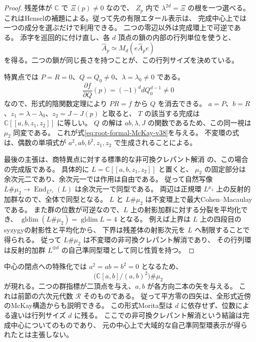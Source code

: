 \begin{proof}
残差体が $\mathbb C$ で $\Xi(p)\ne0$ なので、
$\widehat Z_p$ 内で $\lambda^{2d}=\Xi$ の根を一つ選べる。
これはHenselの補題による。従って先の有限エタール表示は、
完成中心上では一つの成分を選ぶだけで利用できる。
二つの零辺以外は完成環上で可逆である。
添字を巡回的に付け直し、各 $d$ 頂点の鎖の内部の行列単位を使うと、
\[
 \widehat A_p\simeq M_d(e\widehat A_pe)
\]
を得る。二つの鎖が同じ長さを持つことが、この行列サイズを決めている。

特異点では $P=R=0$、$Q=Q_0\ne0$、$\lambda=\lambda_0\ne0$ である。
\[
 \frac{\partial f}{\partial Q}(p)=(-1)^d dQ_0^{d-1}\ne0
\]
なので、形式的陰関数定理により $PR=f$ から $Q$ を消去できる。
$a=P$、$b=R$、$z_1=\lambda-\lambda_0$、$z_2=J-J(p)$ と取ると、
$T$ の該当する完成は $\mathbb C[[a,b,z_1,z_2]]$ に等しい。
$Q$ の解は $ab,\lambda,J$ の関数であるため、この同一視は $\mu_2$ 同変である。
これが式\eqref{eq:root-formal-McKay-v38}を与える。
不変環の式は、偶数の単項式が $a^2,ab,b^2,z_1,z_2$ で生成されることによる。

最後の主張は、商特異点に対する標準的な非可換クレパント解消
\cite[Example~1.1]{VanDenBerghMcKay38}の、この場合の完成版である。
具体的に $L=\mathbb C[[a,b,z_1,z_2]]$ と置くと、
$\mu_2$ の固定部分は余次元二であり、余次元一では作用は自由である。
従って自然写像 $L\#\mu_2\to\operatorname{End}_{L^{\mu_2}}(L)$ は余次元一で同型である。
両辺は正規環 $L^{\mu_2}$ 上の反射的加群なので、全体で同型となる。
$L$ と $L\#\mu_2$ は不変環上で最大Cohen--Macaulayである。
また群の位数が可逆なので、$L$ 上の射影加群に対する分裂を平均化でき、
$\operatorname{gldim}(L\#\mu_2)=\operatorname{gldim}L=4$ となる。
例えば上界は $L$ 上の四段目のsyzygyの射影性と平均化から、
下界は残差体の射影次元を $L$ へ制限することで得られる。
従って $L\#\mu_2$ は不変環の非可換クレパント解消であり、
その行列環は反射的加群 $L^{\oplus d}$ の自己準同型環として同じ性質を持つ。
\end{proof}

中心の閉点への特殊化では $a^2=ab=b^2=0$ となるため、
\[
 \bigl(\mathbb C[a,b]/(a,b)^2\bigr)\#\mu_2
\]
が現れる。二つの群指標が二頂点を与え、$a,b$ が各方向二本の矢を与える。
これは前節の六次元代数 $\mathcal R$ そのものである。
従って平方零の四矢は、全形式近傍のMcKay構造からも説明できる。
この形式Morita型は $d$ に依存せず、位数による違いは行列サイズ $d$ に残る。
ここでの非可換クレパント解消という結論は完成中心についてのものであり、
元の中心上で大域的な自己準同型環表示が得られたとは主張しない。
